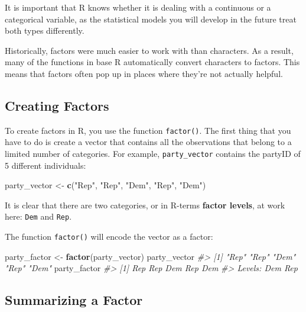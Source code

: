 \documentclass[]{book}
\newenvironment{Shaded}{\begin{snugshade}}{\end{snugshade}}
\newcommand{\KeywordTok}[1]{\textcolor[rgb]{0.13,0.29,0.53}{\textbf{#1}}}
\newcommand{\StringTok}[1]{\textcolor[rgb]{0.31,0.60,0.02}{#1}}
\newcommand{\CommentTok}[1]{\textcolor[rgb]{0.56,0.35,0.01}{\textit{#1}}}
\newcommand{\NormalTok}[1]{#1}
\begin{document}
It is important that R knows whether it is dealing with a continuous or
a categorical variable, as the statistical models you will develop in
the future treat both types differently.

Historically, factors were much easier to work with than characters. As
a result, many of the functions in base R automatically convert
characters to factors. This means that factors often pop up in places
where they're not actually helpful.

\subsection{Creating Factors}\label{creating-factors}

To create factors in R, you use the function \texttt{factor()}. The
first thing that you have to do is create a vector that contains all the
observations that belong to a limited number of categories. For example,
\texttt{party\_vector} contains the partyID of 5 different individuals:

\begin{Shaded}
\begin{Highlighting}[]
\NormalTok{party_vector <-}\StringTok{ }\KeywordTok{c}\NormalTok{(}\StringTok{"Rep"}\NormalTok{, }\StringTok{"Rep"}\NormalTok{, }\StringTok{"Dem"}\NormalTok{, }\StringTok{"Rep"}\NormalTok{, }\StringTok{"Dem"}\NormalTok{)}
\end{Highlighting}
\end{Shaded}

It is clear that there are two categories, or in R-terms \textbf{factor
levels}, at work here: \texttt{Dem} and \texttt{Rep}.

The function \texttt{factor()} will encode the vector as a factor:

\begin{Shaded}
\begin{Highlighting}[]
\NormalTok{party_factor <-}\StringTok{ }\KeywordTok{factor}\NormalTok{(party_vector)}
\NormalTok{party_vector}
\CommentTok{#> [1] "Rep" "Rep" "Dem" "Rep" "Dem"}
\NormalTok{party_factor}
\CommentTok{#> [1] Rep Rep Dem Rep Dem}
\CommentTok{#> Levels: Dem Rep}
\end{Highlighting}
\end{Shaded}

\subsection{Summarizing a Factor}\label{summarizing-a-factor}
\end{document}
